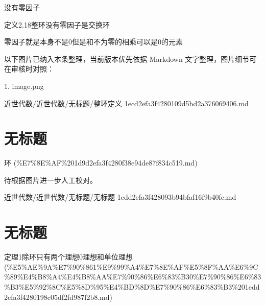 \begin{definition}[整环定义]

没有零因子

定义2.18整环没有零因子是交换环

零因子就是本身不是0但是和不为零的相乘可以是0的元素

\end{definition}

\begin{note}[关联图片]
以下图片已纳入本条整理，当前版本优先依据 Markdown 文字整理，图片细节可在审核时对照：

1. image.png\\

\end{note}

\begin{note}[来源路径]

近世代数/近世代数/无标题/整环定义 1ecd2efa3f4280109d5bd2a376069406.md

\end{note}

\section*{无标题}

\begin{note}[来源上级主题]

环 (\%E7\%8E\%AF\%201d9d2efa3f4280f38e94de87f834c519.md)

\end{note}

\begin{note}[无标题]

待根据图片进一步人工校对。

\end{note}

\begin{note}[来源路径]

近世代数/近世代数/无标题/无标题 1edd2efa3f428093b94bfaf16f9b40fe.md

\end{note}

\section*{无标题}

\begin{note}[来源上级主题]

定理1除环只有两个理想0理想和单位理想 (\%E5\%AE\%9A\%E7\%90\%861\%E9\%99\%A4\%E7\%8E\%AF\%E5\%8F\%AA\%E6\%9C\%89\%E4\%B8\%A4\%E4\%B8\%AA\%E7\%90\%86\%E6\%83\%B30\%E7\%90\%86\%E6\%83\%B3\%E5\%92\%8C\%E5\%8D\%95\%E4\%BD\%8D\%E7\%90\%86\%E6\%83\%B3\%201edd2efa3f4280198c05df2fd987f2b8.md)

\end{note}

